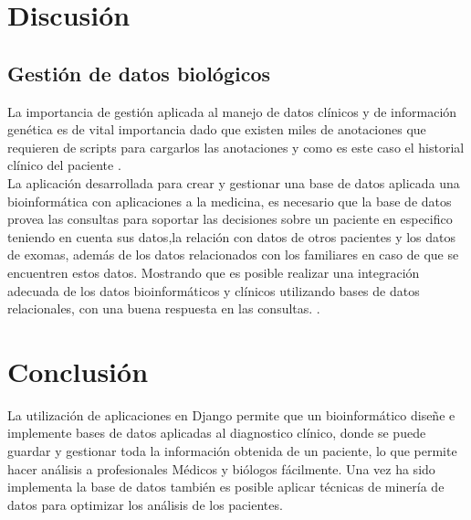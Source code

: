 \section{Discusión}
\subsection{Gestión de datos biológicos}

La importancia de gestión aplicada al manejo de datos clínicos y de información genética es de vital importancia dado que existen miles de anotaciones que requieren de scripts para cargarlos las anotaciones y como es este caso el historial clínico del paciente \cite{Paila2013}. \\

La aplicación desarrollada para crear y gestionar una base de datos aplicada una bioinformática con aplicaciones a la medicina, es necesario que la base de datos provea las consultas para soportar las decisiones sobre un paciente en especifico teniendo en cuenta sus datos,la relación con datos de otros pacientes y los datos de exomas, además de los datos relacionados con los familiares en caso de que se encuentren estos datos. Mostrando que es posible realizar una integración adecuada de los datos bioinformáticos y clínicos utilizando bases de datos relacionales, con una buena respuesta en las consultas. \cite{Sujansky2001}.

\section{Conclusión}
La utilización de aplicaciones en Django permite que un bioinformático diseñe e implemente bases de datos aplicadas al diagnostico clínico, donde se puede guardar y gestionar toda la información obtenida de un paciente, lo que permite hacer análisis a profesionales Médicos y biólogos fácilmente. Una vez ha sido implementa la base de datos también es posible aplicar técnicas de minería de datos para optimizar los análisis  de los pacientes. \\